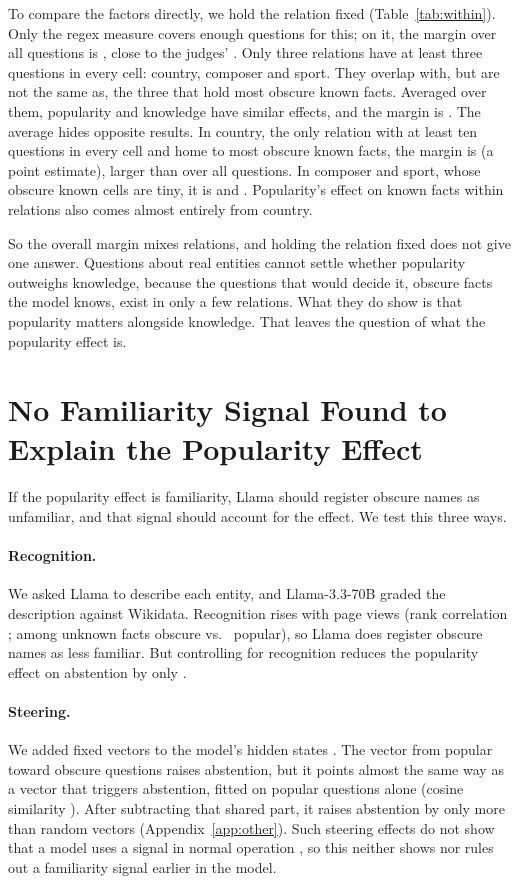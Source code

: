 \documentclass[11pt]{article}
\begin{document}
To compare the factors directly, we hold the relation fixed (Table~\ref{tab:within}). Only the regex measure covers enough questions for this; on it, the margin over all questions is \wrPooledPref, close to the judges' \hmLlamaDiff. Only three relations have at least three questions in every cell: country, composer and sport. They overlap with, but are not the same as, the three that hold most obscure known facts. Averaged over them, popularity and knowledge have similar effects, and the margin is \wrPref{} \wrPrefCI. The average hides opposite results. In country, the only relation with at least ten questions in every cell and home to most obscure known facts, the margin is \wrCountry{} (a point estimate), larger than over all questions. In composer and sport, whose obscure known cells are tiny, it is \wrComposer{} and \wrSport. Popularity's effect on known facts within relations also comes almost entirely from country.

So the overall margin mixes relations, and holding the relation fixed does not give one answer. Questions about real entities cannot settle whether popularity outweighs knowledge, because the questions that would decide it, obscure facts the model knows, exist in only a few relations. What they do show is that popularity matters alongside knowledge. That leaves the question of what the popularity effect is.

\section{No Familiarity Signal Found to Explain the Popularity Effect}
\label{sec:mech}

If the popularity effect is familiarity, Llama should register obscure names as unfamiliar, and that signal should account for the effect. We test this three ways.

\paragraph{Recognition.} We asked Llama to describe each entity, and Llama-3.3-70B graded the description against Wikidata. Recognition rises with page views (rank correlation \ekRho; among unknown facts \mcObsUnkRec{} obscure vs.\ \mcPopUnkRec{} popular), so Llama does register obscure names as less familiar. But controlling for recognition reduces the popularity effect on abstention by only \ekShrink.

\paragraph{Steering.} We added fixed vectors to the model's hidden states \citep{arditi2024refusal}. The vector from popular toward obscure questions raises abstention, but it points almost the same way as a vector that triggers abstention, fitted on popular questions alone (cosine similarity \gaCos). After subtracting that shared part, it raises abstention by only \gaPerp{} \gaPerpCI{} more than random vectors (Appendix~\ref{app:other}). Such steering effects do not show that a model uses a signal in normal operation \citep{che2026steering}, so this neither shows nor rules out a familiarity signal earlier in the model.
\end{document}
